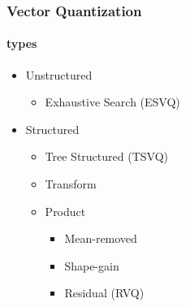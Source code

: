 \begin{frame}
\frametitle{Vector Quantization}
\framesubtitle{types}
\logoCSIPCPL\mypagenum
	\begin{itemize}
		\item Unstructured
			\begin{itemize}
				\item Exhaustive Search (ESVQ)
			\end{itemize}
		\item Structured
		\begin{itemize}
			\item Tree Structured (TSVQ)
			\item Transform
			\item Product
				\begin{itemize}
					\item Mean-removed
					\item Shape-gain
					\item Residual (RVQ)
				\end{itemize}
		\end{itemize}
	\end{itemize}
\end{frame}




